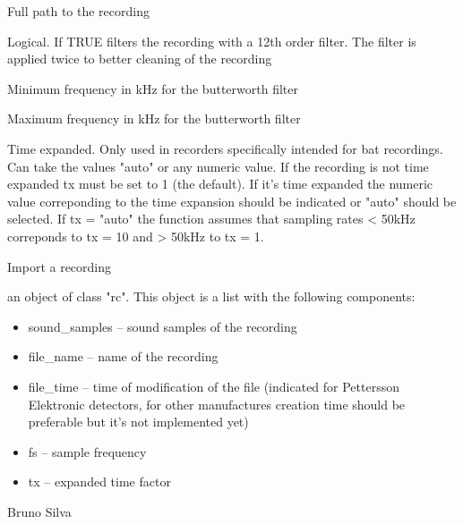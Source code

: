 \documentclass[letterpaper]{book}
\begin{document}
\begin{Arguments}
\begin{ldescription}
\item[\code{path}] Full path to the recording

\item[\code{butt}] Logical. If TRUE filters the recording with a 12th order
filter. The filter is applied twice to better cleaning of the recording

\item[\code{low}] Minimum frequency in kHz for the butterworth filter

\item[\code{high}] Maximum frequency in kHz for the butterworth filter

\item[\code{tx}] Time expanded. Only used in recorders specifically intended for
bat recordings. Can take the values "auto" or any numeric value. If the
recording is not time expanded tx must be set to 1 (the default). If it's
time expanded the numeric value correponding to the time expansion should
be indicated or "auto" should be selected. If tx = "auto" the function
assumes that sampling rates < 50kHz correponds to
tx = 10 and > 50kHz to tx = 1.
\end{ldescription}
\end{Arguments}
%
\begin{Details}\relax
Import a recording
\end{Details}
%
\begin{Value}
an object of class "rc". This object is a list
with the following components:
\begin{itemize}

\item{} sound\_samples -- sound samples of the recording
\item{} file\_name -- name of the recording
\item{} file\_time -- time of modification of the file (indicated for
Pettersson Elektronic detectors, for other manufactures creation time should
be preferable but it's not implemented yet)
\item{} fs -- sample frequency
\item{} tx -- expanded time factor

\end{itemize}

\end{Value}
%
\begin{Author}\relax
Bruno Silva
\end{Author}
\end{document}
